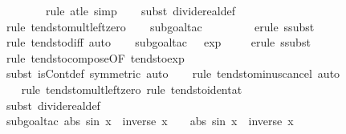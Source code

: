 \documentclass{article}
\theoremstyle{definition}
\begin{document}
\begin{figure}
\begin{isabellebody}
\ \ \isamarkupfalse%
\ {}\isanewline
\ \ \isamarkupfalse%
\ {\isacharparenleft}rule\ at{\isacharunderscore}le{\isacharcomma}\ simp{\isacharparenright}\isanewline
\ \ \isamarkupfalse%
\ {\isacharparenleft}subst\ divide{\isacharunderscore}real{\isacharunderscore}def{\isacharparenright}\isanewline
\ \ \isamarkupfalse%
\ {\isacharparenleft}rule\ tendsto{\isacharunderscore}mult{\isacharunderscore}left{\isacharunderscore}zero{\isacharparenright}{\isacharplus}\isanewline
\ \ \isamarkupfalse%
\ {\isacharparenleft}subgoal{\isacharunderscore}tac\ {\isachardoublequoteopen}{}\ {\isacharequal}\ {}\ {\isacharminus}\ {}{\isachardoublequoteclose}{\isacharparenright}\isanewline
\ \ \isamarkupfalse%
\ {\isacharparenleft}erule\ ssubst{\isacharparenright}\isanewline
\ \ \isamarkupfalse%
\ {\isacharparenleft}rule\ tendsto{\isacharunderscore}diff{\isacharcomma}\ auto{\isacharparenright}\isanewline
\ \ \isamarkupfalse%
\ {\isacharparenleft}subgoal{\isacharunderscore}tac\ {\isachardoublequoteopen}{}\ {\isacharequal}\ exp\ {}{\isachardoublequoteclose}{\isacharparenright}\isanewline
\ \ \isamarkupfalse%
\ {\isacharparenleft}erule\ ssubst{\isacharparenright}\isanewline
\ \ \isamarkupfalse%
\ {\isacharparenleft}rule\ tendsto{\isacharunderscore}compose{\isacharbrackleft}OF\ tendsto{\isacharunderscore}exp{\isacharbrackright}{\isacharparenright}\isanewline
\ \ \isamarkupfalse%
\ {\isacharparenleft}subst\ isCont{\isacharunderscore}def\ {\isacharbrackleft}symmetric{\isacharbrackright}{\isacharcomma}\ auto{\isacharparenright}\isanewline
\ \ \isamarkupfalse%
\ {\isacharparenleft}rule\ tendsto{\isacharunderscore}minus{\isacharunderscore}cancel{\isacharcomma}\ auto{\isacharparenright}\isanewline
\ \ \isamarkupfalse%
\ {\isacharparenleft}rule\ tendsto{\isacharunderscore}mult{\isacharunderscore}left{\isacharunderscore}zero{\isacharcomma}\ rule\ tendsto{\isacharunderscore}ident{\isacharunderscore}at{\isacharparenright}\isanewline
\ \ \isanewline
\ \ \isamarkupfalse%
\ {\isacharparenleft}subst\ divide{\isacharunderscore}real{\isacharunderscore}def{\isacharparenright}{\isacharplus}\isanewline
\ \ \isamarkupfalse%
\ {\isacharparenleft}subgoal{\isacharunderscore}tac\ {\isachardoublequoteopen}abs\ {\isacharparenleft}sin\ x{\isacharparenright}\ {\isacharasterisk}\ inverse\ x\ {\isacharequal}\ {}\ {\isacharasterisk}\ abs\ {\isacharparenleft}sin\ x{\isacharparenright}\ {\isacharasterisk}\ inverse\ x{\isachardoublequoteclose}{\isacharparenright}\isanewline

\end{isabellebody}
\end{figure}
\end{document}
